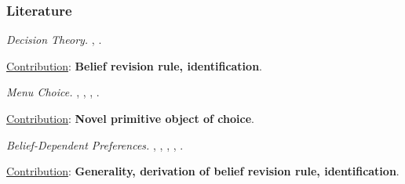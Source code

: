 \documentclass[usenames,dvipsnames,aspectratio=169,11pt, handout]{beamer}
\begin{document}
\begin{frame}\frametitle{Literature}

	\begin{wideitemize}
		\item \textit{Decision Theory.} \cite{liangInformationdependentExpectedUtility2017}, \cite{dillenbergerAdditivebeliefbasedPreferences2020} \cite{rommeswinkelPreferenceKnowledge2023}.

		\vspace{0.3cm}
		\underline{Contribution}: \textbf{Belief revision rule, identification}.
		\item \textit{Menu Choice.} \cite{gulTemptationSelfControl2001}, \cite{ozdenorenCompletingStateSpace2002}, \cite{epsteinAxiomaticModelNonBayesian2006}, \cite{epsteinColdFeet2007}.

		\vspace{0.3cm}
		\underline{Contribution}: \textbf{Novel primitive object of choice}.
		\item \textit{Belief-Dependent Preferences.} \cite{brunnermeierOptimalExpectations2005}, \cite{eliazCanAnticipatoryFeelings2006}, \cite{benabou2016mindful}, \cite{golmanInformationAvoidance2017}, \cite{battigalliBeliefdependentMotivationsPsychological2022}.

		\vspace{0.3cm}
		\underline{Contribution}: \textbf{Generality, derivation of belief revision rule, identification}.
	\end{wideitemize}

\end{frame}
\end{document}

